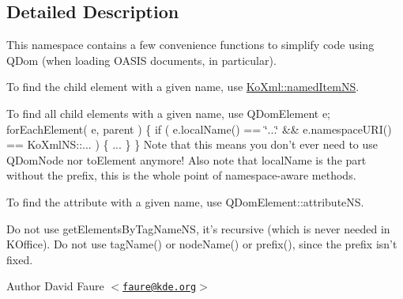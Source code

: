 \subsection{Detailed Description}
This namespace contains a few convenience functions to simplify code using QDom (when loading OASIS documents, in particular).

To find the child element with a given name, use \hyperlink{namespaceKoXml_af571b501c9481cab08bbcf9b9174e4f5}{KoXml::namedItemNS}.

To find all child elements with a given name, use QDomElement e; forEachElement( e, parent ) \{ if ( e.localName() == \char`\"{}...\char`\"{} \&\& e.namespaceURI() == KoXmlNS::... ) \{ ... \} \} Note that this means you don't ever need to use QDomNode nor toElement anymore! Also note that localName is the part without the prefix, this is the whole point of namespace-\/aware methods.

To find the attribute with a given name, use QDomElement::attributeNS.

Do not use getElementsByTagNameNS, it's recursive (which is never needed in KOffice). Do not use tagName() or nodeName() or prefix(), since the prefix isn't fixed.

\begin{DoxyAuthor}{Author}
David Faure $<$\href{mailto:faure@kde.org}{\tt faure@kde.org}$>$ 
\end{DoxyAuthor}


